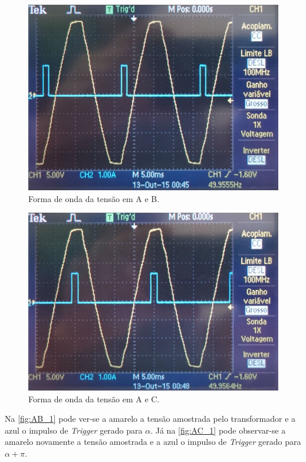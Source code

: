 \documentclass[a4paper,11pt]{article}
\numberwithin{equation}{section}
\begin{document}
\begin{figure}[H]
	\centering
	\includegraphics[keepaspectratio=true, scale=0.11]{img/figs/AB_1}
	\caption{Forma de onda da tensão em A e B.}
	\label{fig:AB_1}
	\vspace{-0.8em}
\end{figure}

\begin{figure}[H]
	\centering
	\includegraphics[keepaspectratio=true, scale=0.1]{img/figs/AC_1}
	\caption{Forma de onda da tensão em A e C.}
	\label{fig:AC_1}
	\vspace{-0.8em}
\end{figure}

Na \autoref{fig:AB_1} pode ver-se a amarelo a tensão amostrada pelo transformador e a azul o impulso de \textit{Trigger} gerado para $\alpha$. Já na \autoref{fig:AC_1} pode observar-se a amarelo novamente a tensão amostrada e a azul o impulso de \textit{Trigger} gerado para $\alpha + \pi$.
\end{document}
